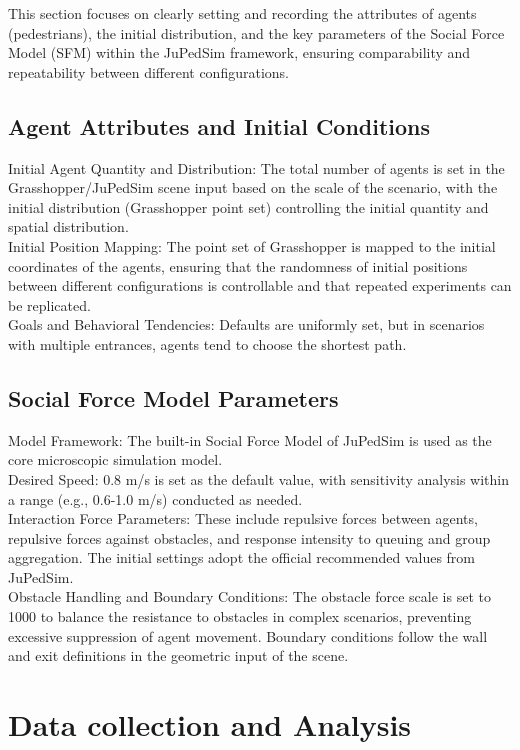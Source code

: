 This section focuses on clearly setting and recording the attributes of agents (pedestrians), the initial distribution, and the key parameters of the Social Force Model (SFM) within the JuPedSim framework, ensuring comparability and repeatability between different configurations.

\subsection{Agent Attributes and Initial Conditions}

Initial Agent Quantity and Distribution: The total number of agents is set in the Grasshopper/JuPedSim scene input based on the scale of the scenario, with the initial distribution (Grasshopper point set) controlling the initial quantity and spatial distribution.
\\Initial Position Mapping: The point set of Grasshopper is mapped to the initial coordinates of the agents, ensuring that the randomness of initial positions between different configurations is controllable and that repeated experiments can be replicated.
\\Goals and Behavioral Tendencies: Defaults are uniformly set, but in scenarios with multiple entrances, agents tend to choose the shortest path.

\subsection{Social Force Model Parameters}

Model Framework: The built-in Social Force Model of JuPedSim is used as the core microscopic simulation model.
\\Desired Speed: 0.8 m/s is set as the default value, with sensitivity analysis within a range (e.g., 0.6-1.0 m/s) conducted as needed.
\\Interaction Force Parameters: These include repulsive forces between agents, repulsive forces against obstacles, and response intensity to queuing and group aggregation. The initial settings adopt the official recommended values from JuPedSim.
\\Obstacle Handling and Boundary Conditions: The obstacle force scale is set to 1000 to balance the resistance to obstacles in complex scenarios, preventing excessive suppression of agent movement. Boundary conditions follow the wall and exit definitions in the geometric input of the scene.

\section{Data collection and Analysis}

